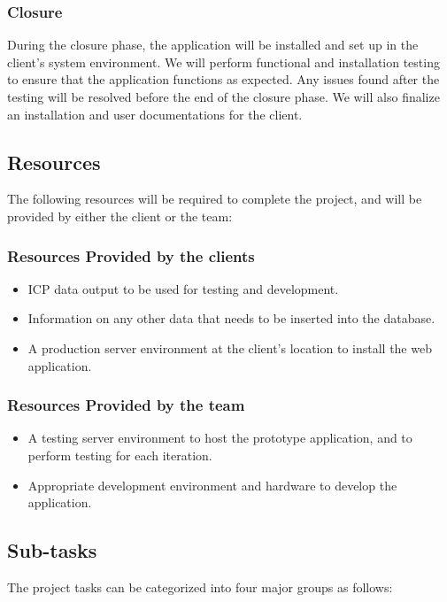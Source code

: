 \documentclass[10pt,twocolumn,letterpaper]{article}
\begin{document}
                \subsubsection{Closure}
                During the closure phase, the application will be installed and set up in the client's system environment. 
                We will perform functional and installation testing to ensure that the application functions as expected. 
                Any issues found after the testing will be resolved before the end of the closure phase. We will also finalize an installation and user documentations for the client.
            \subsection{Resources}

            The following resources will be required to complete the project, and will be provided by either the client or the team:
                \subsubsection{Resources Provided by the clients}
                \begin{itemize}
                  \item ICP data output to be used for testing and development.
                  \item Information on any other data that needs to be inserted into the database.
                  \item A production server environment at the client's location to install the web application.
                \end{itemize}
                \subsubsection{Resources Provided by the team}
                \begin{itemize}
                  \item A testing server environment to host the prototype application, and to perform testing for each iteration.
                  \item Appropriate development environment and hardware to develop the application.
                \end{itemize}
            \subsection{Sub-tasks}
            The project tasks can be categorized into four major groups as follows:
\end{document}
